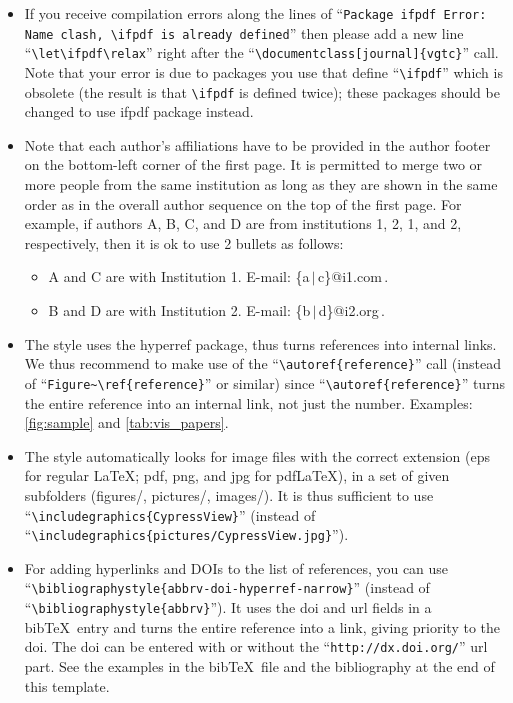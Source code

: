 \documentclass[journal]{vgtc}                %
\begin{document}
\begin{itemize}
\item If you receive compilation errors along the lines of ``\texttt{Package ifpdf Error: Name clash, \textbackslash ifpdf is already defined}'' then please add a new line ``\texttt{\textbackslash let\textbackslash ifpdf\textbackslash relax}'' right after the ``\texttt{\textbackslash documentclass[journal]\{vgtc\}}'' call. Note that your error is due to packages you use that define ``\texttt{\textbackslash ifpdf}'' which is obsolete (the result is that \texttt{\textbackslash ifpdf} is defined twice); these packages should be changed to use ifpdf package instead.
\item Note that each author's affiliations have to be provided in the author footer on the bottom-left corner of the first page. It is permitted to merge two or more people from the same institution as long as they are shown in the same order as in the overall author sequence on the top of the first page. For example, if authors A, B, C, and D are from institutions 1, 2, 1, and 2, respectively, then it is ok to use 2 bullets as follows:
\begin{itemize}
\item A and C are with Institution 1. E-mail: \{a\,$|$\,c\}@i1.com\,.
\item B and D are with Institution 2. E-mail: \{b\,$|$\,d\}@i2.org\,.
\end{itemize}
\item The style uses the hyperref package, thus turns references into internal links. We thus recommend to make use of the ``\texttt{\textbackslash autoref\{reference\}}'' call (instead of ``\texttt{Figure\~{}\textbackslash ref\{reference\}}'' or similar) since ``\texttt{\textbackslash autoref\{reference\}}'' turns the entire reference into an internal link, not just the number. Examples: \autoref{fig:sample} and \autoref{tab:vis_papers}.
\item The style automatically looks for image files with the correct extension (eps for regular \LaTeX; pdf, png, and jpg for pdf\LaTeX), in a set of given subfolders (figures/, pictures/, images/). It is thus sufficient to use ``\texttt{\textbackslash includegraphics\{CypressView\}}'' (instead of ``\texttt{\textbackslash includegraphics\{pictures/CypressView.jpg\}}'').
\item For adding hyperlinks and DOIs to the list of references, you can use ``\texttt{\textbackslash bibliographystyle\{abbrv-doi-hyperref-narrow\}}'' (instead of ``\texttt{\textbackslash bibliographystyle\{abbrv\}}''). It uses the doi and url fields in a bib\TeX\ entry and turns the entire reference into a link, giving priority to the doi. The doi can be entered with or without the ``\texttt{http://dx.doi.org/}'' url part. See the examples in the bib\TeX\ file and the bibliography at the end of this template.\\[1em]

\end{itemize}
\end{document}
